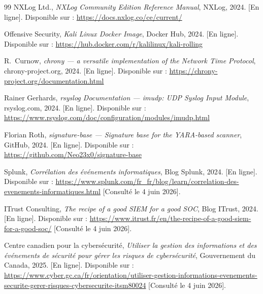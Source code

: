 \documentclass[12pt,a4paper]{article}
\begin{document}
\begin{thebibliography}{99}
NXLog Ltd.,
\textit{NXLog Community Edition Reference Manual},
NXLog, 2024.
[En ligne]. Disponible sur :
\url{https://docs.nxlog.co/ce/current/}

Offensive Security,
\textit{Kali Linux Docker Image},
Docker Hub, 2024.
[En ligne]. Disponible sur :
\url{https://hub.docker.com/r/kalilinux/kali-rolling}

R.~Curnow,
\textit{chrony --- a versatile implementation of the Network Time Protocol},
chrony-project.org, 2024.
[En ligne]. Disponible sur :
\url{https://chrony-project.org/documentation.html}

Rainer Gerhards,
\textit{rsyslog Documentation --- imudp: UDP Syslog Input Module},
rsyslog.com, 2024.
[En ligne]. Disponible sur :
\url{https://www.rsyslog.com/doc/configuration/modules/imudp.html}

Florian Roth,
\textit{signature-base --- Signature base for the YARA-based scanner},
GitHub, 2024.
[En ligne]. Disponible sur :
\url{https://github.com/Neo23x0/signature-base}

Splunk,
\textit{Corrélation des événements informatiques},
Blog Splunk, 2024.
[En ligne]. Disponible sur :
\url{https://www.splunk.com/fr_fr/blog/learn/correlation-des-evenements-informatiques.html}
[Consulté le 4 juin 2026].

ITrust Consulting,
\textit{The recipe of a good SIEM for a good SOC},
Blog ITrust, 2024.
[En ligne]. Disponible sur :
\url{https://www.itrust.fr/en/the-recipe-of-a-good-siem-for-a-good-soc/}
[Consulté le 4 juin 2026].

Centre canadien pour la cybersécurité,
\textit{Utiliser la gestion des informations et des événements de
sécurité pour gérer les risques de cybersécurité},
Gouvernement du Canada, 2025.
[En ligne]. Disponible sur :
\url{https://www.cyber.gc.ca/fr/orientation/utiliser-gestion-informations-evenements-securite-gerer-risques-cybersecurite-itsm80024}
[Consulté le 4 juin 2026].

\end{thebibliography}
\end{document}
